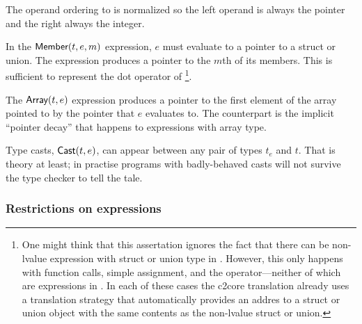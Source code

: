 \begin{docpart}
The operand ordering to  is normalized so the left
operand is always the pointer and the right always the integer.

In the $\textsf{Member}(t,e,m)$ expression, $e$ must evaluate to
a pointer to a struct or union. The  expression
produces a pointer to the $m$th of its members. This is sufficient to
represent the dot operator of \ansiC\footnote
        {One might think that this assertation ignores the fact
        that there can be non-lvalue expression with struct or
        union type in \ansiC. However, this only happens with
        function calls, simple assignment, and the 
        operator---neither of which are expressions in
        \coreC. In each of these cases the c2core translation
        already uses a translation strategy that automatically provides
        an addres to a struct or union object with the same contents
        as the non-lvalue struct or union.}.

The $\textsf{Array}(t,e)$ expression produces a pointer to the
first element of the array pointed to by the pointer that $e$
evaluates to. The \ansiC counterpart is the implicit ``pointer
decay'' that happens to expressions with array type.

Type casts, $\textsf{Cast}(t,e)$, can appear between
any pair of types $t_e$ and $t$. That is theory at least; in practise
programs with badly-behaved casts will not survive
the type checker to tell the tale.

%

\subsubsection{Restrictions on expressions}


\end{docpart}
